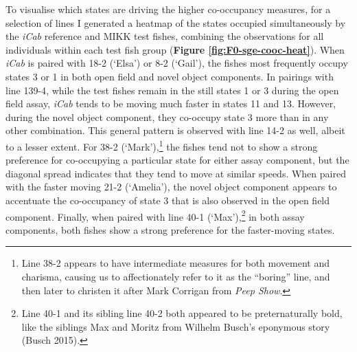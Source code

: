 \documentclass[
]{book}
\begin{document}
To visualise which states are driving the higher co-occupancy measures, for a selection of lines I generated a heatmap of the states occupied simultaneously by the \emph{\textcolor{iCab_424B4D}{iCab}} reference and MIKK test fishes, combining the observations for all individuals within each test fish group (\textbf{Figure \ref{fig:F0-sge-cooc-heat}}). When \emph{\textcolor{iCab_424B4D}{iCab}} is paired with \textcolor{18-2 (‘Elsa’)_FF66A6}{18-2 (‘Elsa’)} or \textcolor{8-2 (‘Gail’)_FF699C}{8-2 (‘Gail’)}, the fishes most frequently occupy states 3 or 1 in both open field and novel object components. In pairings with line \textcolor{139-4_FF61CC}{139-4}, while the test fishes remain in the still states 1 or 3 during the open field assay, \emph{\textcolor{iCab_424B4D}{iCab}} tends to be moving much faster in states 11 and 13. However, during the novel object component, they co-occupy state 3 more than in any other combination. This general pattern is observed with line \textcolor{14-2_F066EA}{14-2} as well, albeit to a lesser extent. For \textcolor{38-2 (‘Mark’)_00C08B}{38-2 (‘Mark’)},\footnote{Line 38-2 appears to have intermediate measures for both movement and charisma, causing us to affectionately refer to it as the ``boring'' line, and then later to christen it after Mark Corrigan from \emph{Peep Show}.} the fishes tend not to show a strong preference for co-occupying a particular state for either assay component, but the diagonal spread indicates that they tend to move at similar speeds. When paired with the faster moving \textcolor{21-2 (‘Amelia’)_49B500}{21-2 (‘Amelia’)}, the novel object component appears to accentuate the co-occupancy of state 3 that is also observed in the open field component. Finally, when paired with line \textcolor{40-1 (‘Max’)_93AA00}{40-1 (‘Max’)},\footnote{Line 40-1 and its sibling line 40-2 both appeared to be preternaturally bold, like the siblings Max and Moritz from Wilhelm Busch's eponymous story (Busch 2015).} in both assay components, both fishes show a strong preference for the faster-moving states.
\end{document}
